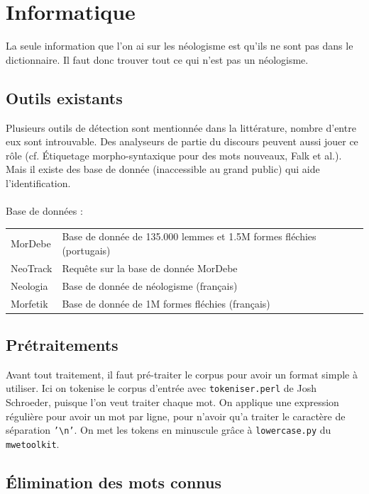 \documentclass{article}
\begin{document}
\section{Informatique}

La seule information que l'on ai sur les néologisme est qu'ils ne sont pas dans le dictionnaire. Il faut donc trouver tout ce qui n'est pas un néologisme.

\subsection{Outils existants}

Plusieurs outils de détection sont mentionnée dans la littérature, nombre d'entre eux sont introuvable. Des analyseurs de partie du discours peuvent aussi jouer ce rôle (cf. Étiquetage morpho-syntaxique pour des mots nouveaux, Falk et al.). Mais il existe des base de donnée (inaccessible au grand public) qui aide l'identification.
\paragraph*{}
Base de données :\newline
\begin{tabular}{ll}
MorDebe & Base de donnée de 135.000 lemmes et 1.5M formes fléchies (portugais)\\
NeoTrack & Requ\^{e}te sur la base de donnée MorDebe\\
Neologia & Base de donnée de néologisme (français)\\
Morfetik & Base de donnée de 1M formes fléchies (français)\\
\end{tabular}
\subsection{Prétraitements}
Avant tout traitement, il faut pré-traiter le corpus pour avoir un format simple à utiliser. Ici on tokenise le corpus d'entrée avec \texttt{tokeniser.perl} de Josh Schroeder, puisque l'on veut traiter chaque mot. On applique une expression régulière pour avoir un mot par ligne, pour n'avoir qu'a traiter le caractère de séparation \texttt{'{\textbackslash}n'}. On met les tokens en minuscule grâce à \texttt{lowercase.py} du \texttt{mwetoolkit}.

\subsection{Élimination des mots connus}
\end{document}
